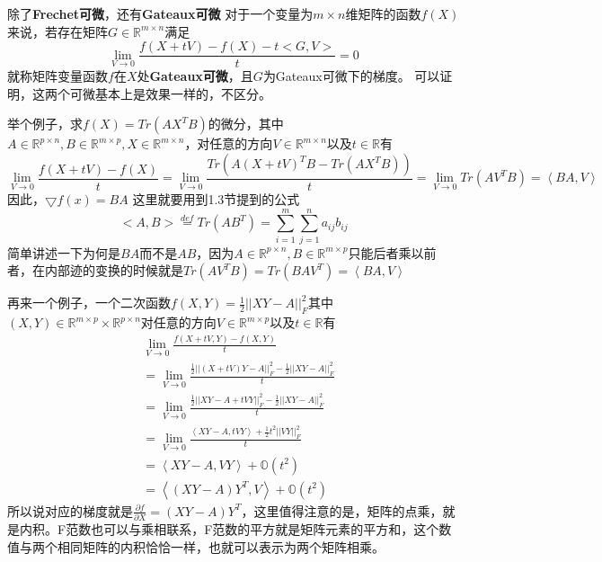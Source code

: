 \documentclass{article}
\begin{document}
除了\textbf{Frechet可微}，还有\textbf{Gateaux可微}
对于一个变量为$m \times n$维矩阵的函数$f(X)$来说，若存在矩阵$G \in \mathbb{R}^{m \times n}$满足
$$
\lim\limits_{V \rightarrow 0} \frac{f(X+tV)-f(X)-t<G,V>}{t}=0
$$
就称矩阵变量函数$f$在$X$处\textbf{Gateaux可微}，且$G$为Gateaux可微下的梯度。
可以证明，这两个可微基本上是效果一样的，不区分。

举个例子，求$f(X)=Tr(AX^TB)$的微分，其中$A \in \mathbb{R}^{p \times n},B \in \mathbb{R}^{m \times p},X \in \mathbb{R}^{m \times n}$，对任意的方向$V \in \mathbb{R}^{m \times n}$以及$t \in \mathbb{R} $有
$$
\lim\limits_{V \rightarrow 0} \frac{f(X+tV)-f(X)}{t}=
\lim\limits_{V \rightarrow 0} \frac{Tr(A(X+tV)^TB-Tr(AX^TB))}{t}=
\lim\limits_{V \rightarrow 0} Tr(AV^TB)=\left \langle BA,V	\right \rangle 
$$
因此，$\bigtriangledown f(x)=BA$
这里就要用到1.3节提到的公式$$<A,B>\overset{def}{=}Tr(AB^T)=\sum\limits_{i=1}^m\sum\limits_{j=1}^na_{ij}b_{ij}$$
简单讲述一下为何是$BA$而不是$AB$，因为$A \in \mathbb{R}^{p \times n},B \in \mathbb{R}^{m \times p}$只能后者乘以前者，在内部迹的变换的时候就是$Tr(AV^TB)=Tr(BAV^T)=\left \langle BA,V	\right \rangle$

再来一个例子，一个二次函数$f(X,Y)=\frac{1}{2} ||XY-A||^2_F$其中$(X,Y) \in \mathbb{R}^{m \times p  }\times  \mathbb{R}^{p \times n}$对任意的方向$V \in \mathbb{R}^{m \times p}$以及$t \in \mathbb{R} $有
\begin{equation}
    \begin{split}
    &\lim\limits_{V \rightarrow 0} \frac{f(X+tV,Y)-f(X,Y)}{t}\\
    &=\lim\limits_{V \rightarrow 0} \frac{\frac{1}{2} ||(X+tV)Y-A||^2_F-\frac{1}{2} ||XY-A||^2_F}{t}\\
    &=\lim\limits_{V \rightarrow 0} \frac{\frac{1}{2} ||XY-A+tVY||^2_F-\frac{1}{2} ||XY-A||^2_F}{t}\\
    &=\lim\limits_{V \rightarrow 0} \frac{\left\langle XY-A,tVY \right\rangle+\frac{1}{2}t^2||VY||^2_F}{t}\\
    &=\left\langle XY-A,VY \right\rangle+\mathbb{O}(t^2)\\
    &=\left\langle (XY-A)Y^T,V \right\rangle+\mathbb{O}(t^2)
    \end{split}
\end{equation}
所以说对应的梯度就是$\frac{\partial f}{\partial X}=(XY-A)Y^T$，这里值得注意的是，矩阵的点乘，就是内积。F范数也可以与乘相联系，F范数的平方就是矩阵元素的平方和，这个数值与两个相同矩阵的内积恰恰一样，也就可以表示为两个矩阵相乘。
\end{document}

